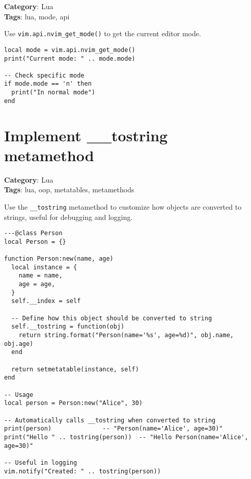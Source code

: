 {{{{{{\textbf{Category}: Lua\\ \textbf{Tags}: lua, mode, api
\vspace{0.5cm}

Use {\footnotesize \Verb§vim.api.nvim_get_mode()§} to get the current editor mode.

\begin{Exa*}{}
\begin{Verbatim}[fontsize=\footnotesize, breaklines, breakanywhere]
local mode = vim.api.nvim_get_mode()
print("Current mode: " .. mode.mode)

-- Check specific mode
if mode.mode == 'n' then
  print("In normal mode")
end
\end{Verbatim}
\end{Exa*}

\section{Implement \_\_tostring metamethod}

\textbf{Category}: Lua\\ \textbf{Tags}: lua, oop, metatables, metamethods
\vspace{0.5cm}

Use the {\footnotesize \Verb§__tostring§} metamethod to customize how objects are converted to strings, useful for debugging and logging.

\begin{Exa*}{}
\begin{Verbatim}[fontsize=\footnotesize, breaklines, breakanywhere]
---@class Person
local Person = {}

function Person:new(name, age)
  local instance = {
    name = name,
    age = age,
  }
  self.__index = self

  -- Define how this object should be converted to string
  self.__tostring = function(obj)
    return string.format("Person(name='%s', age=%d)", obj.name, obj.age)
  end

  return setmetatable(instance, self)
end

-- Usage
local person = Person:new("Alice", 30)

-- Automatically calls __tostring when converted to string
print(person)              -- "Person(name='Alice', age=30)"
print("Hello " .. tostring(person))  -- "Hello Person(name='Alice', age=30)"

-- Useful in logging
vim.notify("Created: " .. tostring(person))
\end{Verbatim}
\end{Exa*}

}}}}}}
